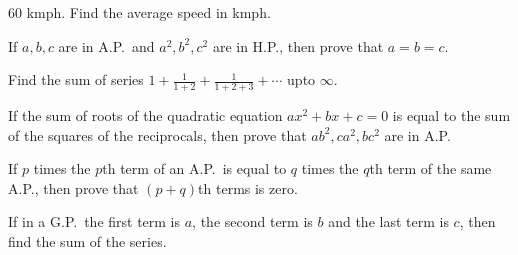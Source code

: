   $60$ kmph. Find the average speed in kmph.
\item If $a, b, c$ are in A.P.\ and $a^2, b^2, c^2$ are in H.P., then prove that $a = b = c$.
\item Find the sum of series $1 + \frac{1}{1 + 2} + \frac{1}{1 + 2 + 3} + \cdots$ upto $\infty$.
\item If the sum of roots of the quadratic equation $ax^2 + bx + c = 0$ is equal to the sum of the squares
  of the reciprocals, then prove that $ab^2, ca^2, bc^2$ are in A.P.
\item If $p$ times the $p$th term of an A.P.\ is equal to $q$ times the $q$th term of the same A.P., then
  prove that $(p + q)$th terms is zero.
\item If in a G.P.\ the first term is $a$, the second term is $b$ and the last term is $c$, then find the
  sum of the series.
\stopitemize
